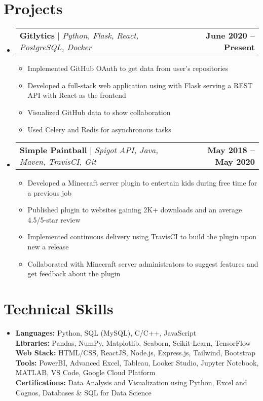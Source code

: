 \documentclass[letterpaper,11pt]{article}
\makeatletter
\newcommand{\resumeProjectHeading}[2]{
    \item
    \begin{tabular*}{0.97\textwidth}{l@{\extracolsep{\fill}}r}
      \small#1 & \textbf{{\small#2}} \\
    \end{tabular*}\vspace{-7pt}
}
\newcommand{\resumeItem}[1]{
  \item\small{
    {#1 \vspace{-2pt}}
  }
}
\newcommand{\resumeSubHeadingListStart}{\begin{itemize}[leftmargin=0.15in, label={}]}
\newcommand{\resumeSubHeadingListEnd}{\end{itemize}}
\newcommand{\resumeItemListStart}{\begin{itemize}}
\newcommand{\resumeItemListEnd}{\end{itemize}\vspace{-5pt}}
\makeatother
\begin{document}
\section{Projects}
    \resumeSubHeadingListStart
      \resumeProjectHeading
          {\textbf{Gitlytics} $|$ \emph{Python, Flask, React, PostgreSQL, Docker}}{June 2020 -- Present}
          \resumeItemListStart
            \resumeItem{Implemented GitHub OAuth to get data from user’s repositories}
            \resumeItem{Developed a full-stack web application using with Flask serving a REST API with React as the frontend}
            \resumeItem{Visualized GitHub data to show collaboration}
            \resumeItem{Used Celery and Redis for asynchronous tasks}
          \resumeItemListEnd
          
      \resumeProjectHeading
          {\textbf{Simple Paintball} $|$ \emph{Spigot API, Java, Maven, TravisCI, Git}}{May 2018 -- May 2020}
          \resumeItemListStart
            \resumeItem{Developed a Minecraft server plugin to entertain kids during free time for a previous job}
            \resumeItem{Published plugin to websites gaining 2K+ downloads and an average 4.5/5-star review}
            \resumeItem{Implemented continuous delivery using TravisCI to build the plugin upon new a release}
            \resumeItem{Collaborated with Minecraft server administrators to suggest features and get feedback about the plugin}
          \resumeItemListEnd
    \resumeSubHeadingListEnd


\section{Technical Skills}
 \begin{itemize}[leftmargin=0.15in, label={}]
    \small \item{
         \textbf{Languages:}{ Python, SQL (MySQL), C/C++, JavaScript} \\
         \textbf{Libraries:}{ Pandas, NumPy, Matplotlib, Seaborn, Scikit-Learn, TensorFlow} \\
         \textbf{Web Stack:}{ HTML/CSS, ReactJS, Node.js, Express.js, Tailwind, Bootstrap} \\
         \textbf{Tools:}{ PowerBI, Advanced Excel, Tableau, Looker Studio, Jupyter Notebook, MATLAB, VS Code, Google Cloud Platform} \\
         \textbf{Certifications:}{ Data Analysis and Visualization using Python, Excel and Cognos, Databases \& SQL for Data Science}
    }
 \end{itemize}
\end{document}
